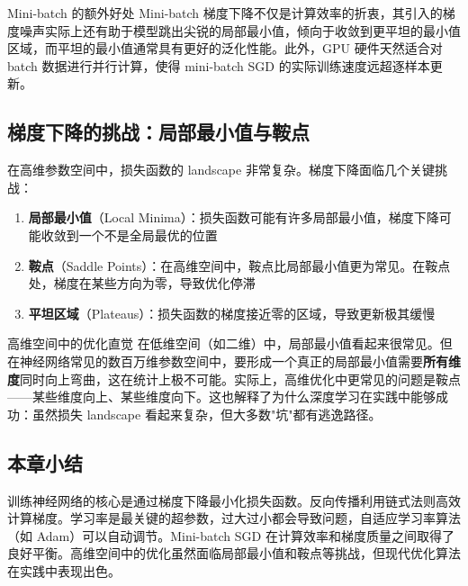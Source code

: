 \begin{knowledgebox}{Mini-batch 的额外好处}
Mini-batch 梯度下降不仅是计算效率的折衷，其引入的梯度噪声实际上还有助于模型跳出尖锐的局部最小值，倾向于收敛到更平坦的最小值区域，而平坦的最小值通常具有更好的泛化性能。此外，GPU 硬件天然适合对 batch 数据进行并行计算，使得 mini-batch SGD 的实际训练速度远超逐样本更新。
\end{knowledgebox}

\subsection{梯度下降的挑战：局部最小值与鞍点}

在高维参数空间中，损失函数的 landscape 非常复杂。梯度下降面临几个关键挑战：

\begin{enumerate}
\item \textbf{局部最小值}（Local Minima）：损失函数可能有许多局部最小值，梯度下降可能收敛到一个不是全局最优的位置
\item \textbf{鞍点}（Saddle Points）：在高维空间中，鞍点比局部最小值更为常见。在鞍点处，梯度在某些方向为零，导致优化停滞
\item \textbf{平坦区域}（Plateaus）：损失函数的梯度接近零的区域，导致更新极其缓慢
\end{enumerate}

\begin{knowledgebox}{高维空间中的优化直觉}
在低维空间（如二维）中，局部最小值看起来很常见。但在神经网络常见的数百万维参数空间中，要形成一个真正的局部最小值需要\textbf{所有维度}同时向上弯曲，这在统计上极不可能。实际上，高维优化中更常见的问题是鞍点——某些维度向上、某些维度向下。这也解释了为什么深度学习在实践中能够成功：虽然损失 landscape 看起来复杂，但大多数"坑"都有逃逸路径。
\end{knowledgebox}

\subsection{本章小结}

训练神经网络的核心是通过梯度下降最小化损失函数。反向传播利用链式法则高效计算梯度。学习率是最关键的超参数，过大过小都会导致问题，自适应学习率算法（如 Adam）可以自动调节。Mini-batch SGD 在计算效率和梯度质量之间取得了良好平衡。高维空间中的优化虽然面临局部最小值和鞍点等挑战，但现代优化算法在实践中表现出色。


